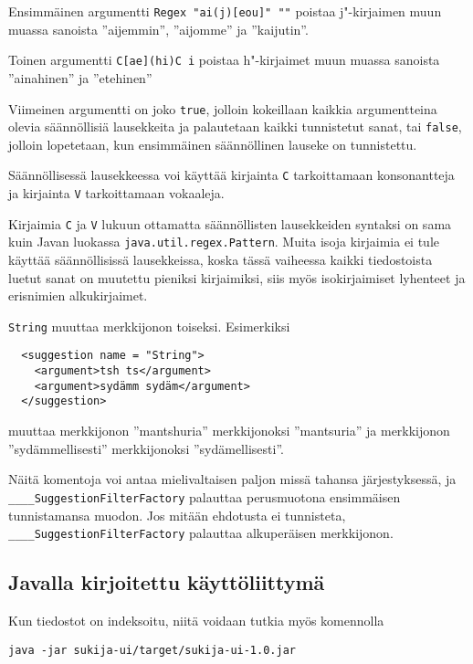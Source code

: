 \documentclass[12pt,a4paper]{scrartcl}
\begin{document}
Ensimmäinen argumentti \verb|Regex "ai(j)[eou]" ""| poistaa
j"-kirjaimen muun muassa sanoista ''aijemmin'', ''aijomme'' ja
''kaijutin''.

Toinen argumentti \verb|C[ae](hi)C i|
poistaa h"-kirjaimet muun muassa sanoista ''ainahinen'' ja
''etehinen''

Viimeinen argumentti on joko \verb|true|, jolloin kokeillaan kaikkia
argumentteina olevia säännöllisiä lausekkeita ja palautetaan kaikki
tunnistetut sanat, tai \verb|false|, jolloin lopetetaan, kun
ensimmäinen säännöllinen lauseke on tunnistettu.

Säännöllisessä lausekkeessa voi käyttää kirjainta \verb|C|
tarkoittamaan konsonantteja ja kirjainta \verb|V| tarkoittamaan
vokaaleja.

Kirjaimia \verb|C| ja \verb|V| lukuun ottamatta säännöllisten
lausekkeiden syntaksi on sama kuin Javan luokassa
\verb=java.util.regex.Pattern=. Muita isoja kirjaimia ei tule
käyttää säännöllisissä lausekkeissa, koska tässä vaiheessa kaikki
tiedostoista luetut sanat on muutettu pieniksi kirjaimiksi, siis myös
isokirjaimiset lyhenteet ja erisnimien alkukirjaimet.


\bigskip
\verb|String| muuttaa merkkijonon toiseksi. Esimerkiksi

\begin{verbatim}
  <suggestion name = "String">
    <argument>tsh ts</argument>
    <argument>sydämm sydäm</argument>
  </suggestion>
\end{verbatim}

muuttaa merkkijonon ''mantshuria'' merkkijonoksi ''mantsuria'' ja
merkkijonon ''sydämmellisesti'' merkkijonoksi ''sydämellisesti''.

\bigskip
Näitä komentoja voi antaa mielivaltaisen paljon missä tahansa
järjestyksessä, ja \\ \verb|____SuggestionFilterFactory| palauttaa
perusmuotona ensimmäisen tunnistamansa muodon. Jos mitään ehdotusta ei
tunnisteta, \verb|____SuggestionFilterFactory| palauttaa alkuperäisen
merkkijonon.


\subsection*{Javalla kirjoitettu käyttöliittymä}

Kun tiedostot on indeksoitu, niitä voidaan tutkia myös komennolla

\verb|java -jar sukija-ui/target/sukija-ui-1.0.jar|
\end{document}
